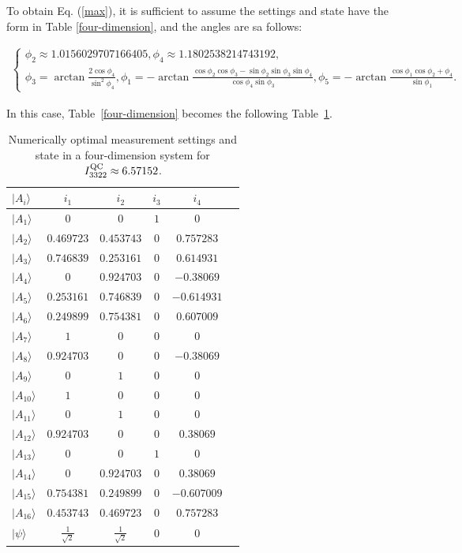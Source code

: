\documentclass[pra,aps,notitlepage,superscriptaddress,showpacs,showkeys]{revtex4-1}
\theoremstyle{definition}
\theoremstyle{remark}
\begin{document}
To obtain Eq. (\ref{max}), it is sufficient to assume the settings and state have the form in Table \ref{four-dimension}, and the angles are sa follows:
\begin{widetext}
\begin{eqnarray}
\left\{
  \begin{array}{ll}
    \phi_{2}\approx 1.0156029707166405,\phi_{4}\approx 1.1802538214743192,\\
    \phi_{3}=\arctan{\frac{2\cos{\phi_4}}{\sin^2{\phi_4}}},
\phi_{1}=-\arctan{\frac{\cos{\phi_2}\cos{\phi_3}-\sin{\phi_2}\sin{\phi_3}\sin{\phi_4}}{\cos{\phi_4}\sin{\phi_3}}},
\phi_{5}=-\arctan{\frac{\cos{\phi_1}\cos{\phi_2+\phi_4}}{\sin{\phi_1}}}.
\end{array}
\right.
\end{eqnarray}
\end{widetext}
In this case, Table~\ref{four-dimension} becomes the following Table~\ref{four-dimension-b}.

\begin{table}[t]
\caption{Numerically optimal measurement settings and state in a four-dimension system for $I_{3322}^{\rm QC}\approx6.57152$.}
\label{numerica3}
\centering
  \begin{tabular}{lccccc} 
  \hline \hline
$|A_i\rangle$ & $i_1$ & $i_2$ & $i_3$ & $i_4$  \\
\hline
$|A_1\rangle$ & $0$ & $0$ & $1$ & $0$  \\
$|A_2\rangle$  & $0.469723$ & $0.453743$ & $0$ & $0.757283$  \\
$|A_3\rangle$ & $0.746839$ & $0.253161$ & $0$ & $0.614931$  \\
$|A_4\rangle$  & $0$ & $0.924703$ & $0$ & $-0.38069$  \\
$|A_5\rangle$ & $0.253161$ & $0.746839$ & $0$ & $-0.614931$  \\
$|A_6\rangle$ & $0.249899$ & $0.754381$ & $0$ & $0.607009$  \\
$|A_7\rangle$ & $1$ & $0$ & $0$ & $0$  \\
$|A_8\rangle$  & $0.924703$ & $0$ & $0$ & $-0.38069$  \\
$|A_9\rangle$  & $0$ & $1$ & $0$ & $0$  \\
$|A_{10}\rangle$  & $1$ & $0$ & $0$ & $0$ \\
$|A_{11}\rangle$ & $0$ & $1$ & $0$ & $0$  \\
$|A_{12}\rangle$  & $0.924703$ & $0$ & $0$ & $0.38069$  \\
$|A_{13}\rangle$  & $0$ & $0$ & $1$ & $0$  \\
$|A_{14}\rangle$  & $0$ & $0.924703$ & $0$ & $0.38069$  \\
$|A_{15}\rangle$ & $0.754381$ & $0.249899$ & $0$ & $-0.607009$  \\
$|A_{16}\rangle$  & $0.453743$ & $0.469723$ & $0$ & $0.757283$  \\
\hline
$|\psi\rangle$ & $\frac{1}{\sqrt{2}}$ & $\frac{1}{\sqrt{2}}$ & $0$ & $0$\\
 \hline \hline
   \end{tabular}
\label{four-dimension-b}
\end{table}
\end{document}
